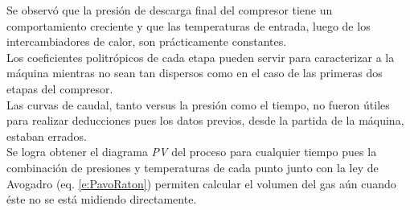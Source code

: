 \documentclass[11pt,letterpaper]{extarticle}        %
\numberwithin{equation}{section}                    %
\begin{document}
Se observó que la presión de descarga final del compresor tiene un comportamiento creciente y que las temperaturas de entrada, luego de los intercambiadores de calor, son prácticamente constantes.\\

Los coeficientes politrópicos de cada etapa pueden servir para caracterizar a la máquina mientras no sean tan dispersos como en el caso de las primeras dos etapas del compresor.\\

Las curvas de caudal, tanto versus la presión como el tiempo, no fueron útiles para realizar deducciones pues los datos previos, desde la partida de la máquina, estaban errados.\\

Se logra obtener el diagrama \textit{PV} del proceso para cualquier tiempo pues la combinación de presiones y temperaturas de cada punto junto con la ley de Avogadro (eq. \ref{e:PavoRaton}) permiten calcular el volumen del gas aún cuando éste no se está midiendo directamente.

\newpage
\end{document}
